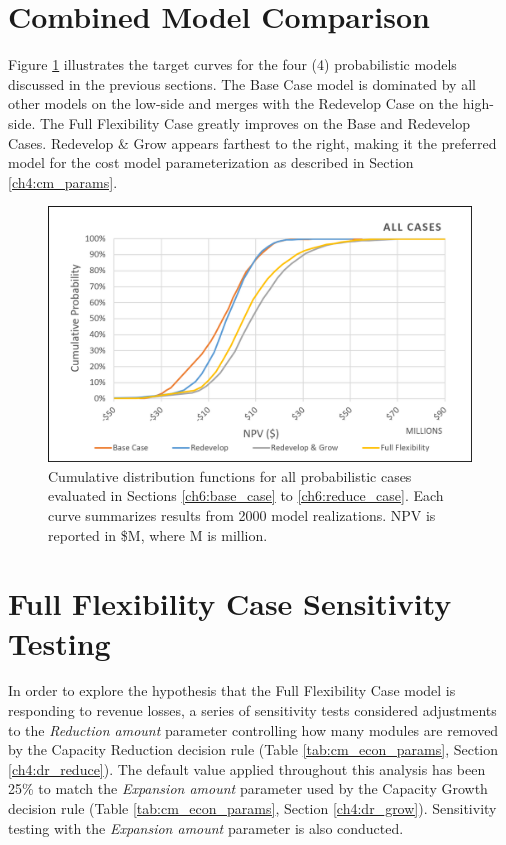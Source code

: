 \section{Combined Model Comparison}

Figure \ref{fig:all_case_cdf} illustrates the target curves for the four (4) probabilistic models discussed in the previous sections. The Base Case model is dominated by all other models on the low-side and merges with the Redevelop Case on the high-side. The Full Flexibility Case greatly improves on the Base and Redevelop Cases. Redevelop \& Grow appears farthest to the right, making it the preferred model for the cost model parameterization as described in Section \ref{ch4:cm_params}. 

\begin{figure}[!htp]
\centering
\includegraphics[width=.85\textwidth]{templates/images/Figure-All_Case_CDF.png}
\caption[All Cases CDF]{Cumulative distribution functions for all probabilistic cases evaluated in Sections \ref{ch6:base_case} to \ref{ch6:reduce_case}. Each curve summarizes results from 2000 model realizations. NPV is reported in \$M, where M is million.}
\label{fig:all_case_cdf}
\end{figure}

\section{Full Flexibility Case Sensitivity Testing}
\label{ch6:sensitivity}

In order to explore the hypothesis that the Full Flexibility Case model is responding to revenue losses, a series of sensitivity tests considered adjustments to the \textit{Reduction amount} parameter controlling how many modules are removed by the Capacity Reduction decision rule (Table \ref{tab:cm_econ_params}, Section \ref{ch4:dr_reduce}). The default value applied throughout this analysis has been 25\% to match the \textit{Expansion amount} parameter used by the Capacity Growth decision rule (Table \ref{tab:cm_econ_params}, Section \ref{ch4:dr_grow}). Sensitivity testing with the \textit{Expansion amount} parameter is also conducted.

